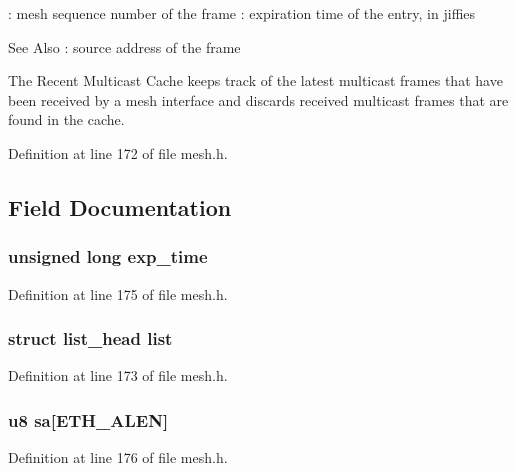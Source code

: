 \-: mesh sequence number of the frame \-: expiration time of the entry, in jiffies \begin{DoxySeeAlso}{See Also}
\-: source address of the frame
\end{DoxySeeAlso}
The Recent Multicast Cache keeps track of the latest multicast frames that have been received by a mesh interface and discards received multicast frames that are found in the cache. 

Definition at line 172 of file mesh.\-h.



\subsection{Field Documentation}
\hypertarget{structrmc__entry_af01b3e5a14761c34e4298e254fb7c094}{
\subsubsection[{exp\-\_\-time}]{\setlength{\rightskip}{0pt plus 5cm}unsigned long exp\-\_\-time}}\label{structrmc__entry_af01b3e5a14761c34e4298e254fb7c094}


Definition at line 175 of file mesh.\-h.

\hypertarget{structrmc__entry_a1f00f18b91d5a820f2c43064243aa86e}{
\subsubsection[{list}]{\setlength{\rightskip}{0pt plus 5cm}struct list\-\_\-head list}}\label{structrmc__entry_a1f00f18b91d5a820f2c43064243aa86e}


Definition at line 173 of file mesh.\-h.

\hypertarget{structrmc__entry_a1d248d85a9aee0de13f6a2647297e517}{
\subsubsection[{sa}]{\setlength{\rightskip}{0pt plus 5cm}u8 sa\mbox{[}E\-T\-H\-\_\-\-A\-L\-E\-N\mbox{]}}}\label{structrmc__entry_a1d248d85a9aee0de13f6a2647297e517}


Definition at line 176 of file mesh.\-h.

